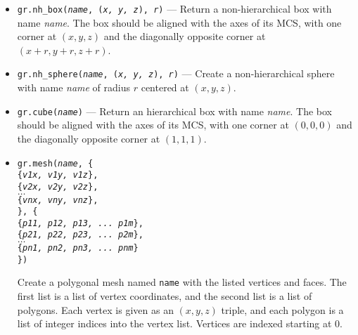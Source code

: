 \begin{itemize}
	\item \texttt{gr.nh\_box(\textit{name}, (\textit{x, y, z}), \textit{r})} ---
		Return a non-hierarchical box with name \textit{name}.  
		The box should be aligned with the axes
		of its MCS, with one corner at $(x,y,z)$ and the diagonally
		opposite corner at $(x+r,y+r,z+r)$.
	\item \texttt{gr.nh\_sphere(\textit{name}, (\textit{x, y, z}), \textit{r})} ---
		Create a non-hierarchical sphere with name \textit{name} of
		radius $r$ centered at $(x,y,z)$.
	\item \texttt{gr.cube(\textit{name})} ---
		Return an hierarchical box with name \textit{name}.  
		The box should be aligned with the axes
		of its MCS, with one corner at $(0,0,0)$ and the diagonally
		opposite corner at $(1,1,1)$.
	\item \texttt{gr.mesh(\textit{name}, \{\\
		\hspace*{.5in} \{\textit{v1x, v1y, v1z}\},\\
		\hspace*{.5in} \{\textit{v2x, v2y, v2z}\},\\
		\hspace*{.5in}$\dots$\\
		\hspace*{.5in} \{\textit{vnx, vny, vnz}\},\\
		\}, \{\\
		\hspace*{.5in} \{\textit{p11, p12, p13, ... p1m}\},\\
		\hspace*{.5in} \{\textit{p21, p22, p23, ... p2m}\},\\
		\hspace*{.5in}$\dots$\\
		\hspace*{.5in} \{\textit{pn1, pn2, pn3, ... pnm}\}\\
		\})}

		Create a polygonal mesh named \texttt{name} with the listed 
		vertices and faces.  The first list is a list
		of vertex coordinates, 
		and the second list is a list of polygons.
		Each vertex is given as an $(x,y,z)$ triple, 
		and each polygon is
		a list of integer indices into the vertex list.  
		Vertices are indexed starting at 0.


\end{itemize}
